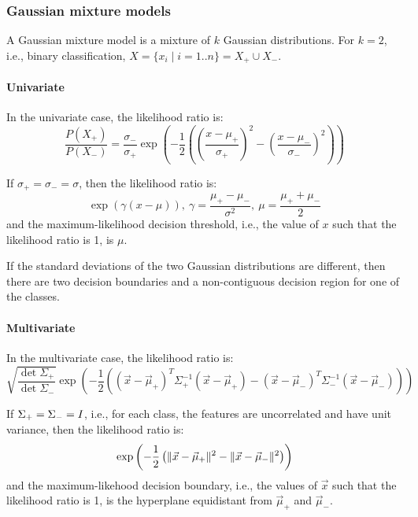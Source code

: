 \subsubsection{Gaussian mixture models}

A Gaussian mixture model is a mixture of $k$ Gaussian distributions.
For $k = 2$, i.e., binary classification,
$X = \{ x_i \mid i = 1 .. n \} = X_+ \cup X_-$.

\paragraph{Univariate}

In the univariate case, the likelihood ratio is:
\begin{equation*}
  \frac{P(X_+)}{P(X_-)}
  = \frac{\sigma_-}{\sigma_+} \exp \left(
  - \frac{1}{2} \left(
    \left( \frac{x - \mu_+}{\sigma_+} \right)^2
    - \left( \frac{x - \mu_-}{\sigma_-} \right)^2
    \right)
  \right)
\end{equation*}

If $\sigma_+ = \sigma_- = \sigma$, then the likelihood ratio is:
\begin{equation*}
  \exp (\gamma (x - \mu)) ,\
  \gamma = \frac{\mu_+ - \mu_-}{\sigma^2} ,\
  \mu = \frac{\mu_+ + \mu_-}{2}
\end{equation*}
and the maximum-likelihood decision threshold, i.e., the value of $x$ such
that the likelihood ratio is 1, is $\mu$.

If the standard deviations of the two Gaussian distributions are different, then
there are two decision boundaries and a non-contiguous decision region for one
of the classes.

\paragraph{Multivariate}

In the multivariate case, the likelihood ratio is:
\begin{equation*}
  \sqrt{\frac{\det\Sigma_+}{\det\Sigma_-}}
  \exp \left(-\frac{1}{2} \left(
    \left(\vec{x} - \vec{\mu}_+ \right)^T \Sigma_+^{-1}
    \left(\vec{x} - \vec{\mu}_+ \right) -
    \left(\vec{x} - \vec{\mu}_- \right)^T \Sigma_-^{-1}
    \left(\vec{x} - \vec{\mu}_- \right)
    \right) \right)
\end{equation*}

If $\Sigma_+ = \Sigma_- = I$, i.e., for each class, the
features are uncorrelated and have unit variance, then the likelihood ratio is:
\begin{equation*}
  \exp \left(
  -\frac{1}{2} \left(
    \lVert \vec{x} - \vec{\mu}_+ \rVert^2 - \lVert \vec{x} - \vec{\mu}_- \rVert^2
    \right)\right)
\end{equation*}
and the maximum-likehood decision boundary, i.e., the values of $\vec{x}$ such
that the likelihood ratio is 1, is the hyperplane equidistant from $\vec{\mu}_+$
and $\vec{\mu}_-$.

